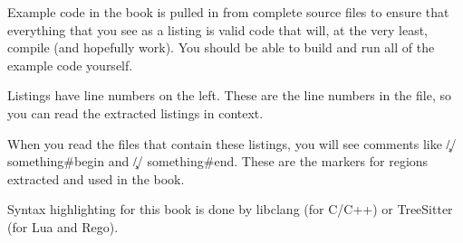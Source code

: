 Example code in the book is pulled in from complete source files to ensure that everything that you see as a listing is valid code that will, at the very least, compile (and hopefully work).
You should be able to build and run all of the example code yourself.

Listings have line numbers on the left.
These are the line numbers in the file, so you can read the extracted listings in context.

When you read the files that contain these listings, you will see comments like \c{// something#begin} and \c{// something#end}.
These are the markers for regions extracted and used in the book.

Syntax highlighting for this book is done by libclang (for C/C++) or TreeSitter (for Lua and Rego).
